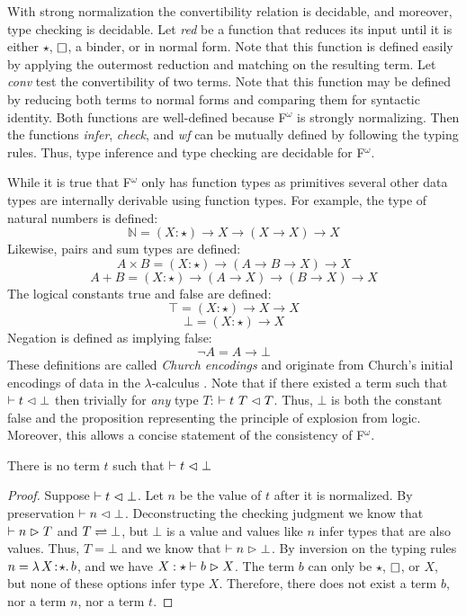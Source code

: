 With strong normalization the convertibility relation is decidable, and moreover, type checking is decidable.
Let \textit{red} be a function that reduces its input until it is either $\star$, $\kind$, a binder, or in normal form.
Note that this function is defined easily by applying the outermost reduction and matching on the resulting term.
Let \textit{conv} test the convertibility of two terms.
Note that this function may be defined by reducing both terms to normal forms and comparing them for syntactic identity.
Both functions are well-defined because F$^\omega$ is strongly normalizing.
Then the functions \textit{infer}, \textit{check}, and \textit{wf} can be mutually defined by following the typing rules.
Thus, type inference and type checking are decidable for F$^\omega$.

While it is true that F$^\omega$ only has function types as primitives several other data types are internally derivable using function types.
For example, the type of natural numbers is defined:
$$\mathbb{N} = (X : \star) \to X \to (X \to X) \to X$$
Likewise, pairs and sum types are defined:
$$A \times B = (X : \star) \to (A \to B \to X) \to X$$
$$A + B = (X : \star) \to (A \to X) \to (B \to X) \to X$$
The logical constants true and false are defined:
$$\top = (X : \star) \to X \to X$$
$$\bot = (X : \star) \to X$$
Negation is defined as implying false:
$$\neg A = A \to \bot$$
These definitions are called \textit{Church encodings} and originate from Church's initial encodings of data in the $\lambda$-calculus \cite{church1932,church1933}.
Note that if there existed a term such that $\vdash t \vartriangleleft \bot$ then trivially for \textit{any} type $T$: $\vdash t\ T \vartriangleleft T$.
Thus, $\bot$ is both the constant false and the proposition representing the principle of explosion from logic.
Moreover, this allows a concise statement of the consistency of F$^\omega$.

\begin{theorem}
    There is no term $t$ such that $\vdash t \vartriangleleft \bot$
\end{theorem}
\begin{proof}
    Suppose $\vdash t \vartriangleleft \bot$.
    Let $n$ be the value of $t$ after it is normalized.
    By preservation $\vdash n \vartriangleleft \bot$.
    Deconstructing the checking judgment we know that $\vdash n \vartriangleright T$ and $T \rightleftharpoons \bot$, but $\bot$ is a value and values like $n$ infer types that are also values.
    Thus, $T = \bot$ and we know that $\vdash n \vartriangleright \bot$.
    By inversion on the typing rules $n = {\lambda}\, X\! : \! \star.\, b$, and we have $X : \star \vdash b \vartriangleright X$.
    The term $b$ can only be $\star$, $\kind$, or $X$, but none of these options infer type $X$.
    Therefore, there does not exist a term $b$, nor a term $n$, nor a term $t$.
\end{proof}

